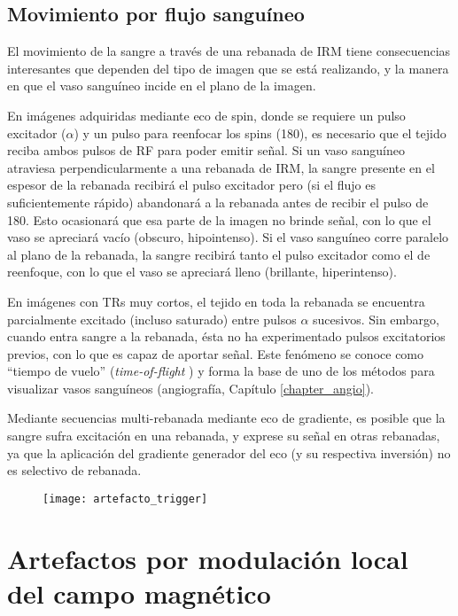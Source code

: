 \subsection{Movimiento por flujo sanguíneo}
El movimiento de la sangre a través de una rebanada de IRM tiene consecuencias interesantes que dependen del tipo de imagen que se está realizando, y la manera en que el vaso sanguíneo incide en el plano de la imagen. 

En imágenes adquiridas mediante eco de spin, donde se requiere un pulso excitador ($\alpha$\degrees) y un pulso para reenfocar los spins (180\degrees), es necesario que el tejido reciba ambos pulsos de RF para poder emitir señal. Si un vaso sanguíneo atraviesa perpendicularmente a una rebanada de IRM, la sangre presente en el espesor de la rebanada recibirá el pulso excitador pero (si el flujo es suficientemente rápido) abandonará a la rebanada antes de recibir el pulso de 180\degrees. Esto ocasionará que esa parte de la imagen no brinde señal, con lo que el vaso se apreciará vacío (obscuro, hipointenso). Si el vaso sanguíneo corre paralelo al plano de la rebanada, la sangre recibirá tanto el pulso excitador como el de reenfoque, con lo que el vaso se apreciará lleno (brillante, hiperintenso).

En imágenes con TRs muy cortos, el tejido en toda la rebanada se encuentra parcialmente excitado (incluso saturado) entre pulsos $\alpha$ sucesivos. Sin embargo, cuando entra sangre a la rebanada, ésta no ha experimentado pulsos excitatorios previos, con lo que es capaz de aportar señal. Este fenómeno se conoce como ``tiempo de vuelo'' (\textit{time-of-flight} ) y forma la base de uno de los métodos para visualizar vasos sanguíneos (angiografía, Capítulo \ref{chapter_angio}). 

Mediante secuencias multi-rebanada mediante eco de gradiente, es posible que la sangre sufra excitación en una rebanada, y exprese su señal en otras rebanadas, ya que la aplicación del gradiente generador del eco (y su respectiva inversión) no es selectivo de rebanada. 

\begin{figure}[htb]
 \begin{figg}
   \texttt{[image: artefacto\_trigger]}
   \caption{\figurapendiente}
 \label{fig:artefacto_trigger}
 \end{figg}
\end{figure}
 



\section{Artefactos por modulación local del campo magnético}
